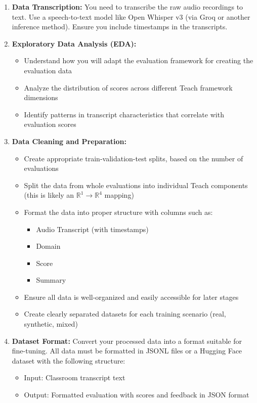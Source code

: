 \documentclass[11pt]{article}
\begin{document}
\begin{enumerate}
    \item \textbf{Data Transcription:} You need to transcribe the raw audio recordings to text. Use a speech-to-text model like Open Whisper v3 (via Groq or another inference method). Ensure you include timestamps in the transcripts.
    
    \item \textbf{Exploratory Data Analysis (EDA):} 
    \begin{itemize}
        \item Understand how you will adapt the evaluation framework for creating the evaluation data
        \item Analyze the distribution of scores across different Teach framework dimensions
        \item Identify patterns in transcript characteristics that correlate with evaluation scores
    \end{itemize}
    
    \item \textbf{Data Cleaning and Preparation:}
    \begin{itemize}
        \item Create appropriate train-validation-test splits, based on the number of evaluations
        \item Split the data from whole evaluations into individual Teach components (this is likely an $\mathbb{R}^1 \to \mathbb{R}^4$ mapping)
        \item Format the data into proper structure with columns such as:
        \begin{itemize}
            \item Audio Transcript (with timestamps)
            \item Domain
            \item Score
            \item Summary
        \end{itemize}
        \item Ensure all data is well-organized and easily accessible for later stages
        \item Create clearly separated datasets for each training scenario (real, synthetic, mixed)
    \end{itemize}
    
    \item \textbf{Dataset Format:} Convert your processed data into a format suitable for fine-tuning. All data must be formatted in JSONL files or a Hugging Face dataset with the following structure:
    \begin{itemize}
        \item Input: Classroom transcript text
        \item Output: Formatted evaluation with scores and feedback in JSON format
    \end{itemize}
\end{enumerate}
\end{document}
